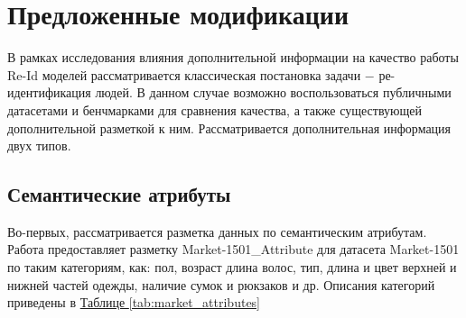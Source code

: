 \chapter{Предложенные модификации}
\label{ch:modifications}

В рамках исследования влияния дополнительной информации на качество работы Re-Id моделей рассматривается классическая постановка задачи $-$ ре-идентификация людей. В данном случае возможно воспользоваться публичными датасетами и бенчмарками для сравнения качества, а также существующей дополнительной разметкой к ним. Рассматривается дополнительная информация двух типов.


\section{Семантические атрибуты}

Во-первых, рассматривается разметка данных по семантическим атрибутам. Работа \cite{lin2019improving} предоставляет разметку Market-1501\_Attribute для датасета Market-1501 \cite{zheng2015scalable} по таким категориям, как: пол, возраст длина волос, тип, длина и цвет верхней и нижней частей одежды, наличие сумок и рюкзаков и др. Описания категорий приведены в \hyperref[tab:market_attributes]{Таблице \ref*{tab:market_attributes}}

